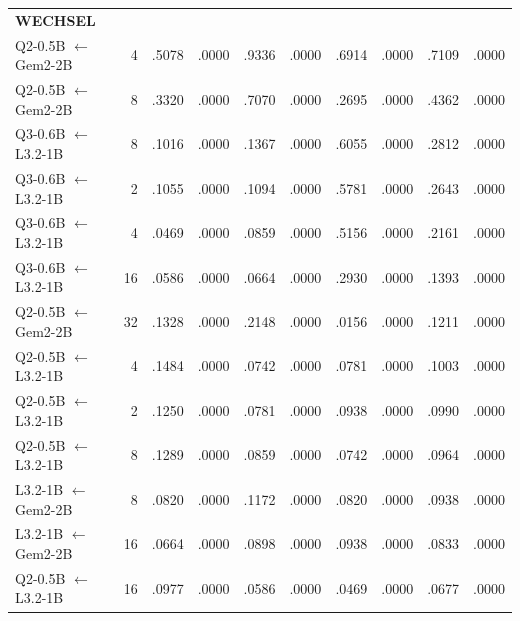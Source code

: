 \begin{longtable}{p{}rrrrrrrrr}
\midrule
\multicolumn{10}{l}{\textbf{WECHSEL}} \\
\addlinespace[2pt]
Q2-0.5B $\leftarrow$ Gem2-2B & 4 & .5078 & .0000 & .9336 & .0000 & .6914 & .0000 & .7109 & .0000 \\
Q2-0.5B $\leftarrow$ Gem2-2B & 8 & .3320 & .0000 & .7070 & .0000 & .2695 & .0000 & .4362 & .0000 \\
Q3-0.6B $\leftarrow$ L3.2-1B & 8 & .1016 & .0000 & .1367 & .0000 & .6055 & .0000 & .2812 & .0000 \\
Q3-0.6B $\leftarrow$ L3.2-1B & 2 & .1055 & .0000 & .1094 & .0000 & .5781 & .0000 & .2643 & .0000 \\
Q3-0.6B $\leftarrow$ L3.2-1B & 4 & .0469 & .0000 & .0859 & .0000 & .5156 & .0000 & .2161 & .0000 \\
Q3-0.6B $\leftarrow$ L3.2-1B & 16 & .0586 & .0000 & .0664 & .0000 & .2930 & .0000 & .1393 & .0000 \\
Q2-0.5B $\leftarrow$ Gem2-2B & 32 & .1328 & .0000 & .2148 & .0000 & .0156 & .0000 & .1211 & .0000 \\
Q2-0.5B $\leftarrow$ L3.2-1B & 4 & .1484 & .0000 & .0742 & .0000 & .0781 & .0000 & .1003 & .0000 \\
Q2-0.5B $\leftarrow$ L3.2-1B & 2 & .1250 & .0000 & .0781 & .0000 & .0938 & .0000 & .0990 & .0000 \\
Q2-0.5B $\leftarrow$ L3.2-1B & 8 & .1289 & .0000 & .0859 & .0000 & .0742 & .0000 & .0964 & .0000 \\
L3.2-1B $\leftarrow$ Gem2-2B & 8 & .0820 & .0000 & .1172 & .0000 & .0820 & .0000 & .0938 & .0000 \\
L3.2-1B $\leftarrow$ Gem2-2B & 16 & .0664 & .0000 & .0898 & .0000 & .0938 & .0000 & .0833 & .0000 \\
Q2-0.5B $\leftarrow$ L3.2-1B & 16 & .0977 & .0000 & .0586 & .0000 & .0469 & .0000 & .0677 & .0000 \\
\end{longtable}
\endgroup
